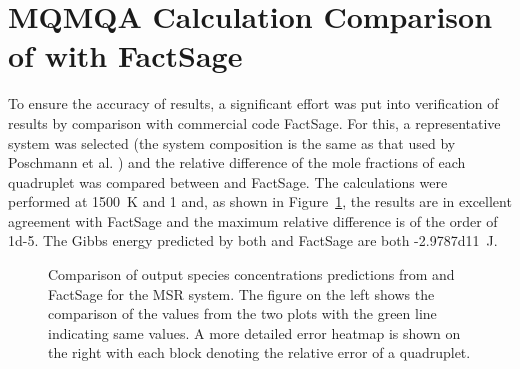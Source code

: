 \section{MQMQA Calculation Comparison of {\GEM} with FactSage}
To ensure the accuracy of results, a significant effort was put into verification of {\GEM} results by comparison with commercial code FactSage. For this, a representative system was selected (the system composition is the same as that used by Poschmann et al. \cite{Poschmann:2021ab}) and the relative difference of the mole fractions of each quadruplet was compared between {\GEM} and FactSage. The calculations were performed at \SI{1500}{\kelvin} and \SI{1}{\atmosphere} and, as shown in Figure~\ref{fig:verif}, the results are in excellent agreement with FactSage and the maximum relative difference is of the order of \num{1d-5}. The Gibbs energy predicted by both {\GEM} and FactSage are both \SI{-2.9787d11}{\joule}. 
\begin{figure}[!ht]
    \hfill
    \caption[Comparison of output species concentrations predictions from {\GEM} and FactSage for the MSR system.]{Comparison of output species concentrations predictions from {\GEM} and FactSage for the MSR system. The figure on the left shows the comparison of the values from the two plots with the green line indicating same values. A more detailed error heatmap is shown on the right with each block denoting the relative error of a quadruplet.}
    \label{fig:verif}
\end{figure}

